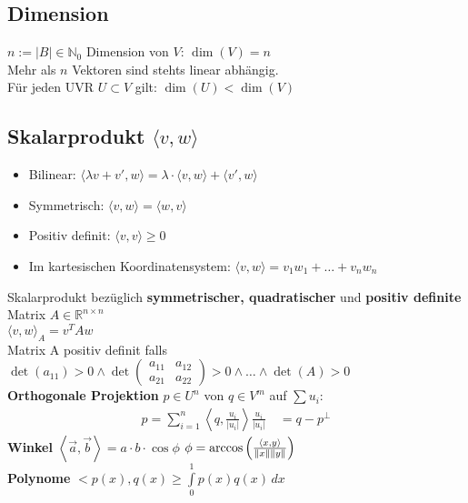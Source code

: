 \documentclass[7pt,a4paper]{scrartcl}
\newcommand{\enbrace}[1]{\ensuremath{\left(#1\right)}}
\newcommand{\norm}[2][\relax]{\ifx#1\relax \ensuremath{\left\Vert#2\right\Vert}\else \ensuremath{\left\Vert#2\right\Vert_{#1}}\fi}
\newcommand{\abs}[1]{\ensuremath{\left\vert#1\right\vert}}
\begin{document}
\begin{multicols}{3}
\subsection{Dimension}
$n:= \abs{B} \in \mathbb N_0$  Dimension von $V$: $\dim (V) = n$ \\
Mehr als $n$ Vektoren sind stehts linear abhängig. \\
Für jeden UVR $U \subset V$ gilt: $\dim (U) < \dim (V)$ 

\subsection{Skalarprodukt $\langle v,w \rangle$} 
\begin{itemize}\itemsep0pt
	\item Bilinear: $\langle \lambda v+v',w \rangle=\lambda\cdot\langle v,w \rangle + \langle v',w \rangle$
	\item Symmetrisch: $\langle v,w \rangle=\langle w,v \rangle$
	\item Positiv definit: $\langle v,v \rangle\ge0$ 
	\item Im kartesischen Koordinatensystem: $\langle v,w \rangle=v_1 w_1+…+v_n w_n$
\end{itemize}  
Skalarprodukt bezüglich \textbf{symmetrischer, quadratischer} und \textbf{positiv definite} Matrix $A\in \mathbb R^{n\times n}$\\
$\langle v,w \rangle_A=v^T A w$\\
Matrix A positiv definit falls $\det (a_{11}) > 0 \land \det \left(\begin{matrix} a_11 & a_12\\ a_21 & a_22\end{matrix}\right) > 0 \land \dotsc \land \det (A)>0$   \\
\textbf{Orthogonale Projektion} $p\in U^n$ von $q\in V^m$ auf $\sum u_i$:
\begin{eqnarray*}
	p=\sum_{i=1}^n \left\langle q, \frac{u_i}{\abs{u_i}}\right\rangle\frac{u_i}{\abs{u_i}} \quad = q - p^\perp
\end{eqnarray*} 
\textbf{Winkel} \quad 	$\left\langle \vec a, \vec b \right\rangle = a \cdot b \cdot \cos \phi$ \qquad
$\phi = \arccos \enbrace{ \frac{\left\langle x, y\right\rangle }{\norm{x} \norm{y} } }$\\
\textbf{Polynome} $<p(x),q(x)\geq\int\limits_{0}^{1}p(x)q(x)\,dx$


\end{multicols}
\end{document}
